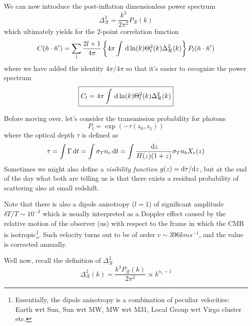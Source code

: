 We can now introduce the post-inflation dimensionless power spectrum
\begin{equation}
    \Delta_{\mathcal{R}}^{2} = \frac{k^{3}}{2\pi^{2}}P_{\mathcal{R}}(k)
    \label{eq:dimensionless-ps}
\end{equation}
which ultimately yields for the 2-point correlation function
\begin{equation}
    C(\hat{n}\cdot \hat{n}') = \sum_{l}\frac{2l+1}{4\pi}\left\{4\pi \int \,\text{d}\ln(k)\Theta_{l}^{2}(k)\Delta_{\mathcal{R}}^{2}(k) \right\}P_{l}(\hat{n}\cdot \hat{n}')
\end{equation}
where we have added the identity $4\pi / 4\pi$ so that it's easier to recognize the power spectrum 
\begin{equation}
    \boxed{
    C_{l} = 4\pi \int \,\text{d}\ln(k)\Theta_{l}^{2}(k)\Delta_{\mathcal{R}}^{2}(k)
    }
    \label{eq:powerspectrumcmb}
\end{equation}
\par Before moving over, let's consider the transmission probability for photons 
\begin{equation}
    P_{t} = \exp\left(-\tau(z_{0}, z_{1})\right)
\end{equation}
where the optical depth $\tau$ is defined as 
\begin{equation}
    \tau = \int \Gamma \,\text{d}t = \int \sigma_{T}n_{e}\,\text{d}t = \int \frac{\,\text{d}z}{H(z)(1+z)}\sigma_{T}n_{b}X_{e}(z)
\end{equation}
Sometimes we might also define a \emph{visibility function} $g(z) = \text{d}\tau/\text{d}z$, but at the end of the day what both are telling us is that there exists a residual probability of scattering also at small redshift.
\par Note that there is also a dipole anisotropy ($l=1$) of significant amplitude $\delta T/T \sim 10^{-3}$ which is usually interpreted as a Doppler effect caused by the relative motion of the observer (us) with respect to the frame in which the CMB is isotropic\footnote{Essentially, the dipole anisotropy is a combination of peculiar velocities: Earth wrt Sun, Sun wrt MW, MW wrt M31, Local Group wrt Virgo cluster etc.}. Such velocity turns out to be of order $v \sim 396 \unit{km}\unit{s}^{-1}$, and the value is corrected annually.
\par Well now, recall the definition of $\Delta_{\mathcal{R}}^{2}$
\begin{equation}
    \Delta_{\mathcal{R}}^{2}(k) = \frac{k^{3}P_{\mathcal{R}}(k)}{2\pi^{2}} \propto k^{n_{s}-1}
\end{equation}
